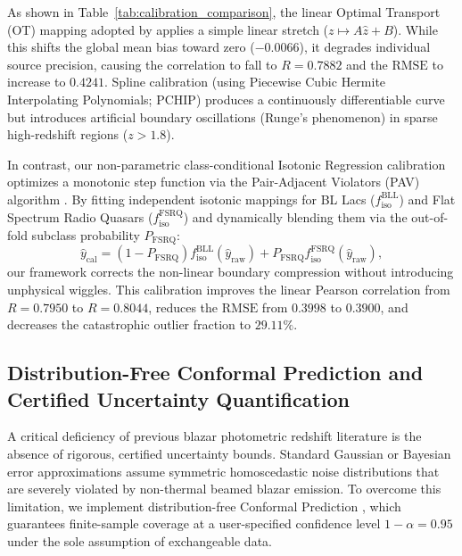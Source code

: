\documentclass[twocolumn,linenumbers,floatfix]{aastex701}
\begin{document}
As shown in Table~\ref{tab:calibration_comparison}, the linear Optimal Transport (OT) mapping adopted by \citet{Narendra2022} applies a simple linear stretch ($z \mapsto A\hat{z} + B$). While this shifts the global mean bias toward zero ($-0.0066$), it degrades individual source precision, causing the correlation to fall to $R = 0.7882$ and the $\text{RMSE}$ to increase to $0.4241$. Spline calibration (using Piecewise Cubic Hermite Interpolating Polynomials; PCHIP) produces a continuously differentiable curve but introduces artificial boundary oscillations (Runge's phenomenon) in sparse high-redshift regions ($z > 1.8$).

In contrast, our non-parametric class-conditional Isotonic Regression calibration optimizes a monotonic step function via the Pair-Adjacent Violators (PAV) algorithm \citep{Barlow1972}. By fitting independent isotonic mappings for BL Lacs ($f_{\text{iso}}^{\text{BLL}}$) and Flat Spectrum Radio Quasars ($f_{\text{iso}}^{\text{FSRQ}}$) and dynamically blending them via the out-of-fold subclass probability $P_{\text{FSRQ}}$:
\begin{equation}
\hat{y}_{\text{cal}} = (1 - P_{\text{FSRQ}}) f_{\text{iso}}^{\text{BLL}}(\hat{y}_{\text{raw}}) + P_{\text{FSRQ}} f_{\text{iso}}^{\text{FSRQ}}(\hat{y}_{\text{raw}}),
\end{equation}
our framework corrects the non-linear boundary compression without introducing unphysical wiggles. This calibration improves the linear Pearson correlation from $R = 0.7950$ to $R = 0.8044$, reduces the $\text{RMSE}$ from $0.3998$ to $0.3900$, and decreases the catastrophic outlier fraction to $29.11\%$.

\subsection{Distribution-Free Conformal Prediction and Certified Uncertainty Quantification}
\label{sec:conformal_verification}

A critical deficiency of previous blazar photometric redshift literature is the absence of rigorous, certified uncertainty bounds. Standard Gaussian or Bayesian error approximations assume symmetric homoscedastic noise distributions that are severely violated by non-thermal beamed blazar emission. To overcome this limitation, we implement distribution-free Conformal Prediction \citep{Vovk2005, Angelopoulos2021, Barber2021}, which guarantees finite-sample coverage at a user-specified confidence level $1 - \alpha = 0.95$ under the sole assumption of exchangeable data.
\end{document}
